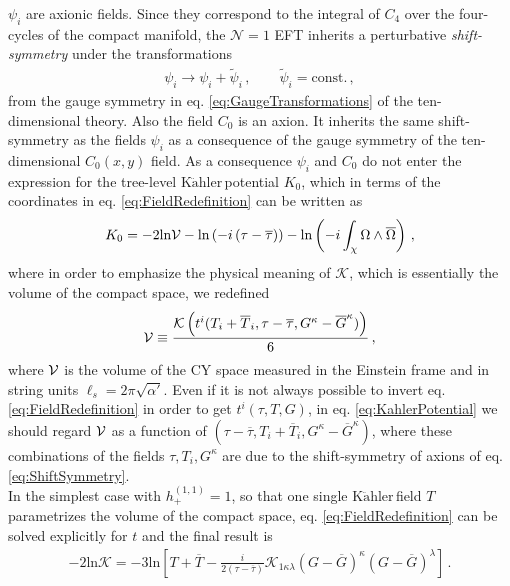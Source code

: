 \documentclass[12pt,a4paper]{book}
\newcommand{\Kahler}{\ensuremath{\text{K}\ddot{\text{a}}\text{hler}\,}}
\newcommand{\V}{{\cal{V}}}
\begin{document}
$\psi_i$ are axionic fields. Since they correspond to the integral of $C_4$ over the four-cycles of the compact manifold, the $\mathcal{N} = 1$ EFT inherits a perturbative \textit{shift-symmetry} under the transformations
\begin{align}
\label{eq:ShiftSymmetry}
\psi_i \rightarrow \psi_i + \tilde{\psi}_i \,, \qquad \tilde{\psi}_i = \text{const.}\,,
\end{align}
from the gauge symmetry in eq. \eqref{eq:GaugeTransformations} of the ten-dimensional theory. Also the field $C_0$ is an axion. It inherits the same shift-symmetry as the fields $\psi_i$ as a consequence of the gauge symmetry of the ten-dimensional $C_0(x,y)$ field. As a consequence $\psi_i$ and $C_0$ do not enter the expression for the tree-level \Kahler potential $K_0$, which in terms of the coordinates in eq. \eqref{eq:FieldRedefinition} can be written as
\begin{align}
\label{eq:KahlerPotential}
K_0 = - 2 \text{ln} \V - \text{ln} \left(-i \left(\tau - \overline{\tau}\right)\right) - \text{ln} \left(-i \int_\chi \Omega \wedge \overline{\Omega} \right)\,,
\end{align}
where in order to emphasize the physical meaning of $\mathcal{K}$, which is essentially the volume of the compact space, we redefined
\begin{align}
\label{eq:VolumeStandardForm}
\V \equiv \frac{\mathcal{K}\left(t^i(T_i + \overline{T}_i, \tau - \overline{\tau}, G^\kappa - \overline{G}^\kappa)\right)}{6} \,,
\end{align}
where $\V$ is the volume of the CY space measured in the Einstein frame and in string units $\ell_s = 2 \pi \sqrt{\alpha'}$. Even if it is not always possible to invert eq. \eqref{eq:FieldRedefinition} in order to get $t^i(\tau, T, G)$, in eq. \eqref{eq:KahlerPotential} we should regard $\V$ as a function of $(\tau - \overline{\tau}, T_i + \overline{T}_i, G^{\kappa} - \overline{G}^\kappa)$, where these combinations of the fields $\tau, T_i, G^{\kappa}$ are due to the shift-symmetry of axions of eq. \eqref{eq:ShiftSymmetry}.\\

In the simplest case with $h_+^{(1,1)} = 1$, so that one single \Kahler field $T$ parametrizes the volume of the compact space, eq. \eqref{eq:FieldRedefinition} can be solved explicitly for $t$ and the final result is
\begin{align}
\label{eq:KahlerPotentialSingleField}
-2 \text{ln} \mathcal{K} = -3 \text{ln} \left[T + \overline{T} - \frac{i}{2(\tau - \overline{\tau})} \mathcal{K}_{1 \kappa \lambda} (G - \overline{G})^\kappa (G - \overline{G})^\lambda\right]\,.
\end{align}
\end{document}
